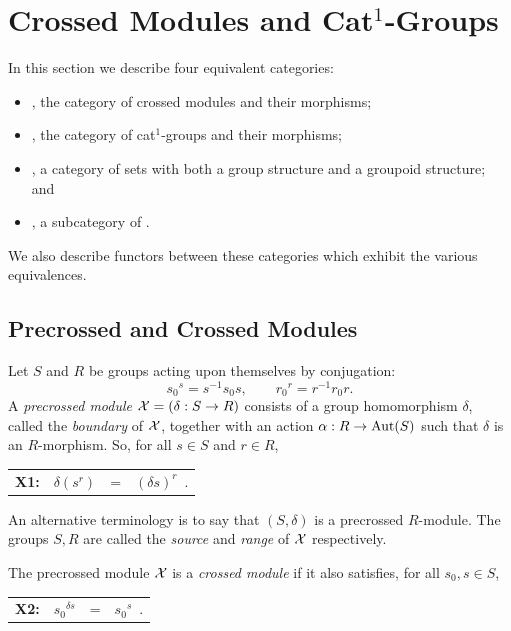 
\section{Crossed Modules and Cat$^1$-Groups} \label{sect:xmod}

In this section we describe four equivalent categories:
\begin{itemize}
\item
{\catXMod}, the category of crossed modules and their morphisms;
\item
{}, the category of cat$^1$-groups and their morphisms; 
\item
{\catGpGpd}, a category of sets with both a group structure 
and a groupoid structure; and 
\item 
{\cattGp}, a subcategory of {\cattCat}.
\end{itemize}
We also describe functors between these categories which exhibit
the various equivalences.


\subsection{Precrossed and Crossed Modules}

Let $S$ and $R$ be groups acting upon themselves by conjugation:
$$
{s_0}^s = s^{-1}s_0s, \qquad {r_0}^r = r^{-1}r_0r.
$$
A \emph{precrossed module}   
$\mathcal{X} = (\delta : S \to R )$ 
consists of a group homomorphism $\delta $,  
called the \emph{boundary} of $\mathcal{X}$, 
together with an action 
$\alpha : R \to \mathrm{Aut}(S)$ such that $\delta$  is an $R$-morphism.
So, for all $s \in S$  and  $r \in R$,
\begin{center}
\begin{tabular}{ c r c l }
\textbf{X1:} &  $\delta(s^r)$   &  =  &  $(\delta s)^r$~.
\end{tabular}
\end{center}
An alternative terminology is to say that  $(S,\delta)$
is a precrossed $R$-module.
  
The groups $S,R$ are called the \emph{source} and \emph{range} of $\mathcal{X}$ 
respectively. 

The precrossed module  $\mathcal{X}$  is a \emph{crossed module} 
if it also satisfies, for all  $s_0,s \in S$,
\begin{center}
\begin{tabular}{ c r c l }
\textbf{X2:} &  ${s_0}^{\delta s}$  &  =  &  ${s_0}^s$~. 
\end{tabular}
\end{center}

